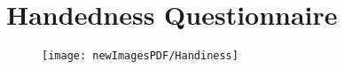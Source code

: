 \section{Handedness Questionnaire}


\begin{figure}[b]
	\begin{center}
		\texttt{[image: newImagesPDF/Handiness]}
	\end{center}
\end{figure}

